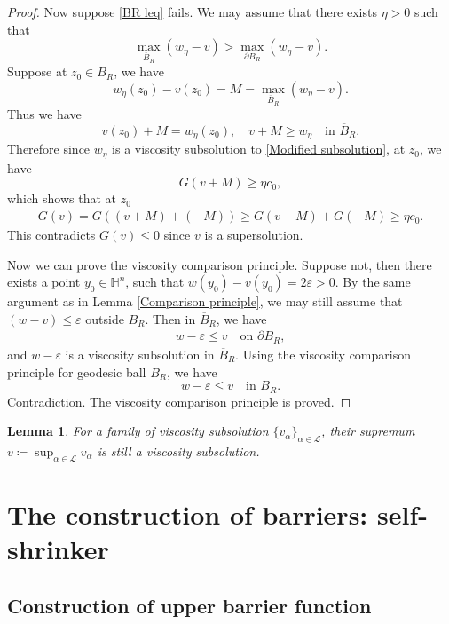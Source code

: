 \documentclass[reqno]{amsart}
\newtheorem{lemma}[theorem]{Lemma}
\theoremstyle{remark}
\theoremstyle{definition}
\numberwithin{equation}{section}
\begin{document}
\begin{proof}
    
    Now suppose \eqref{BR leq} fails. We may assume  that there exists $\eta>0$ such that 
    \[
    \max_{\overline{B}_R} \left( w_{\eta}-v \right) > \max_{\partial B_R} \left( w_{\eta}-v \right).
    \]
    Suppose at $z_0 \in B_R$, we have
    \[
    w_{\eta}(z_0)-v(z_0) = M = \max_{\overline{B}_R} \left( w_{\eta}-v \right).
    \]
    Thus we have
    \[
    v(z_0) + M = w_{\eta}(z_0), \quad v + M \geqslant w_{\eta} \quad \text{in } \overline{B}_R.
    \]
    Therefore since $w_{\eta}$ is a viscosity subsolution to \eqref{Modified subsolution}, at $z_0$, we have
    \[
    G(v+M) \geqslant \eta c_0,
    \]
    which shows that at $z_0$
    \begin{align*}
        G(v) = G((v+M) + (-M)) \geqslant G(v+M) + G(-M) \geqslant \eta c_0.
    \end{align*}
    This contradicts $G(v) \leqslant 0$ since $v$ is a supersolution.

    Now we can prove the viscosity comparison principle. Suppose not, then there exists a point $y_0 \in \mathbb{H}^n$, such that $w(y_0) - v(y_0) = 2\varepsilon > 0$. By the same argument as in Lemma \ref{Comparison principle}, we may still assume that $(w-v) \leqslant \varepsilon$ outside $B_R$. Then in $\overline{B}_R$, we have 
    \begin{align*}
        w - \varepsilon \leqslant v \quad \text{on } \partial B_R,
    \end{align*}
    and $w - \varepsilon$ is a viscosity subsolution in $\overline{B}_R$. Using the viscosity comparison principle for geodesic ball $B_R$, we have
    \[
    w - \varepsilon \leqslant v \quad \text{in } B_R.
    \]
    Contradiction. The viscosity comparison principle is proved.
\end{proof}

\begin{lemma}
    For a family of viscosity subsolution $\{v_{\alpha}\}_{\alpha \in \mathcal{L}}$, their supremum $v \coloneqq \sup_{\alpha \in \mathcal{L}} v_{\alpha}$ is still a viscosity subsolution.
\end{lemma}


\section{The construction of barriers: self-shrinker}\label{The construction of barriers: self-shrinker}


\subsection{Construction of upper barrier function}
\end{document}
